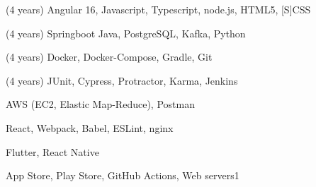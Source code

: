 
\begin{cvskills}


  {(4 years) Angular 16, Javascript, Typescript, node.js, HTML5, [S]CSS}

  {(4 years) Springboot Java, PostgreSQL, Kafka, Python}

  {(4 years) Docker, Docker-Compose, Gradle, Git}

  {(4 years) JUnit, Cypress, Protractor, Karma, Jenkins}

  \vspace{0.5em}
  {AWS (EC2, Elastic Map-Reduce), Postman}

  {React, Webpack, Babel, ESLint, nginx}

  {Flutter, React Native}

  {App Store, Play Store, GitHub Actions, Web servers1}

\end{cvskills}
